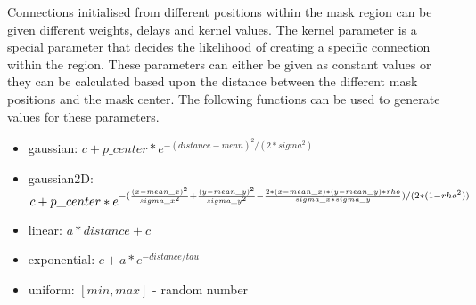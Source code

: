 \documentclass{article}
\begin{document}
Connections initialised from different positions within the mask region can be given different weights, delays and kernel values. The kernel parameter is a special parameter that decides the likelihood of creating a specific connection within the region. These parameters can either be given as constant values or they can be calculated based upon the distance between the different mask positions and the mask center. The following functions can be used to generate values for these parameters.


\begin{itemize}
\item gaussian: $c + p\_center * e^{-(distance-mean)^2/(2*sigma^2)}$
\item gaussian2D: $c + p\_center * \newline e^{-(\frac{(x-mean\_x)^2}{sigma\_x^2} + \frac{(y-mean\_y)^2}{sigma\_y^2} - \frac{2*(x-mean\_x)*(y-mean\_y)*rho}{sigma\_x*sigma\_y})/(2*(1-rho^2))}$ 
\item linear: $a*distance + c$
\item exponential: $c + a*e^{-distance/tau}$
\item uniform: $[min, max]$ - random number
\end{itemize}


\end{document}

